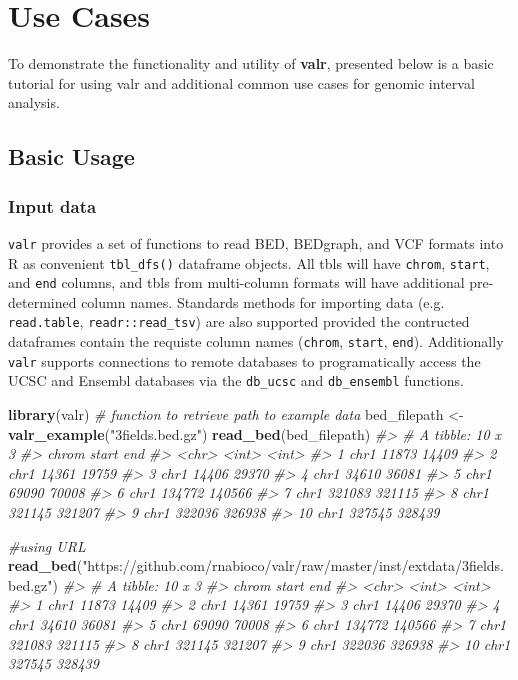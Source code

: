 \documentclass[9pt,a4paper]{extarticle}
\renewcommand{\KeywordTok}[1]{\textbf{{#1}}}
\renewcommand{\StringTok}[1]{\textcolor[rgb]{0.87,0.00,0.00}{{#1}}}
\renewcommand{\CommentTok}[1]{\textcolor[rgb]{0.50,0.50,0.50}{\textit{{#1}}}}
\renewcommand{\NormalTok}[1]{{#1}}
\begin{document}
\section*{Use Cases}
To demonstrate the functionality and utility of \textbf{valr}, presented below is a basic tutorial for using valr and additional common use cases for genomic interval analysis.

\subsection*{Basic Usage}

\subsubsection*{Input data}\label{input-data}

\texttt{valr} provides a set of functions to read BED, BEDgraph, and VCF formats into R as convenient \texttt{tbl\_dfs()} dataframe objects. All tbls will have \texttt{chrom}, \texttt{start}, and \texttt{end} columns, and tbls from multi-column formats will have additional pre-determined column names. Standards methods for importing data (e.g. \texttt{read.table}, \texttt{readr::read\_tsv}) are also supported provided the contructed dataframes contain the requiste column names (\texttt{chrom}, \texttt{start}, \texttt{end}). Additionally \texttt{valr} supports connections to remote databases to programatically access the UCSC and Ensembl databases via the \texttt{db\_ucsc} and \texttt{db\_ensembl} functions.

\begin{Highlighting}[]
\KeywordTok{library}\NormalTok{(valr)}
\CommentTok{# function to retrieve path to example data}
\NormalTok{bed_filepath <-}\StringTok{ }\KeywordTok{valr_example}\NormalTok{(}\StringTok{"3fields.bed.gz"}\NormalTok{) }
\KeywordTok{read_bed}\NormalTok{(bed_filepath) }
\CommentTok{#> # A tibble: 10 x 3}
\CommentTok{#>    chrom  start    end}
\CommentTok{#>    <chr>  <int>  <int>}
\CommentTok{#>  1  chr1  11873  14409}
\CommentTok{#>  2  chr1  14361  19759}
\CommentTok{#>  3  chr1  14406  29370}
\CommentTok{#>  4  chr1  34610  36081}
\CommentTok{#>  5  chr1  69090  70008}
\CommentTok{#>  6  chr1 134772 140566}
\CommentTok{#>  7  chr1 321083 321115}
\CommentTok{#>  8  chr1 321145 321207}
\CommentTok{#>  9  chr1 322036 326938}
\CommentTok{#> 10  chr1 327545 328439}

\CommentTok{#using URL}
\KeywordTok{read_bed}\NormalTok{(}\StringTok{"https://github.com/rnabioco/valr/raw/master/inst/extdata/3fields.bed.gz"}\NormalTok{)}
\CommentTok{#> # A tibble: 10 x 3}
\CommentTok{#>    chrom  start    end}
\CommentTok{#>    <chr>  <int>  <int>}
\CommentTok{#>  1  chr1  11873  14409}
\CommentTok{#>  2  chr1  14361  19759}
\CommentTok{#>  3  chr1  14406  29370}
\CommentTok{#>  4  chr1  34610  36081}
\CommentTok{#>  5  chr1  69090  70008}
\CommentTok{#>  6  chr1 134772 140566}
\CommentTok{#>  7  chr1 321083 321115}
\CommentTok{#>  8  chr1 321145 321207}
\CommentTok{#>  9  chr1 322036 326938}
\CommentTok{#> 10  chr1 327545 328439}
\end{Highlighting}
\end{document}
